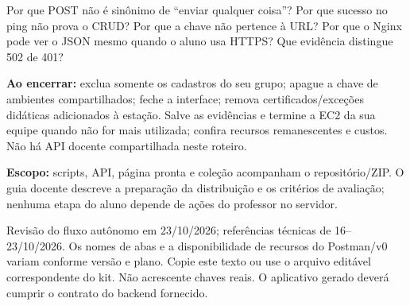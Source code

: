 Por que POST não é sinônimo de ``enviar qualquer coisa''? Por que sucesso no ping não prova o CRUD? Por que a chave não pertence à URL? Por que o Nginx pode ver o JSON mesmo quando o aluno usa HTTPS? Que evidência distingue 502 de 401?

\textbf{Ao encerrar:} exclua somente os cadastros do seu grupo; apague a chave de ambientes compartilhados; feche a interface; remova certificados/exceções didáticas adicionados à estação. Salve as evidências e termine a EC2 da sua equipe quando não for mais utilizada; confira recursos remanescentes e custos. Não há API docente compartilhada neste roteiro.

\textbf{Escopo:} scripts, API, página pronta e coleção acompanham o repositório/ZIP. O guia docente descreve a preparação da distribuição e os critérios de avaliação; nenhuma etapa do aluno depende de ações do professor no servidor.

{\footnotesize Revisão do fluxo autônomo em 23/10/2026; referências técnicas de 16--23/10/2026. Os nomes de abas e a disponibilidade de recursos do Postman/v0 variam conforme versão e plano.}
Copie este texto ou use o arquivo editável correspondente do kit. Não acrescente chaves reais. O aplicativo gerado deverá cumprir o contrato do backend fornecido.

\finalizar
